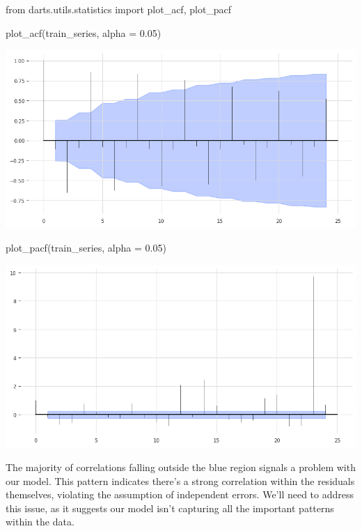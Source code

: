 \documentclass[
  11pt,
]{article}
\newenvironment{Shaded}{\begin{snugshade}}{\end{snugshade}}
\newcommand{\FloatTok}[1]{\textcolor[rgb]{0.68,0.00,0.00}{#1}}
\newcommand{\ImportTok}[1]{\textcolor[rgb]{0.00,0.46,0.62}{#1}}
\newcommand{\NormalTok}[1]{\textcolor[rgb]{0.00,0.23,0.31}{#1}}
\newcommand{\OperatorTok}[1]{\textcolor[rgb]{0.37,0.37,0.37}{#1}}
\begin{document}
\begin{Shaded}
\begin{Highlighting}[]
\ImportTok{from}\NormalTok{ darts.utils.statistics }\ImportTok{import}\NormalTok{ plot\_acf, plot\_pacf}

\NormalTok{plot\_acf(train\_series, alpha }\OperatorTok{=} \FloatTok{0.05}\NormalTok{)}
\end{Highlighting}
\end{Shaded}

\includegraphics{hw3_files/figure-pdf/cell-38-output-1.png}

\begin{Shaded}
\begin{Highlighting}[]
\NormalTok{plot\_pacf(train\_series, alpha }\OperatorTok{=} \FloatTok{0.05}\NormalTok{)}
\end{Highlighting}
\end{Shaded}

\includegraphics{hw3_files/figure-pdf/cell-39-output-1.png}

The majority of correlations falling outside the blue region signals a
problem with our model. This pattern indicates there's a strong
correlation within the residuals themselves, violating the assumption of
independent errors. We'll need to address this issue, as it suggests our
model isn't capturing all the important patterns within the data.
\end{document}
